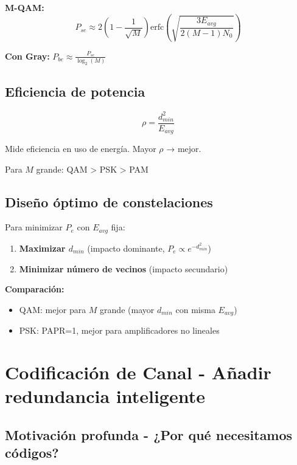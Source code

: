 \documentclass[10pt,a4paper]{article}
\begin{document}
\textbf{M-QAM:}
$$P_{se} \approx 2\left(1-\frac{1}{\sqrt{M}}\right)\text{erfc}\left(\sqrt{\frac{3E_{avg}}{2(M-1)N_0}}\right)$$

\textbf{Con Gray:} $P_{be} \approx \frac{P_{se}}{\log_2(M)}$

\subsection{Eficiencia de potencia}

$$\rho = \frac{d_{min}^2}{E_{avg}}$$

Mide eficiencia en uso de energía. Mayor $\rho$ → mejor.

Para $M$ grande: QAM > PSK > PAM

\subsection{Diseño óptimo de constelaciones}

\begin{tcolorbox}[colback=azulclaro!10,colframe=azuloscuro,title=Principios]
Para minimizar $P_e$ con $E_{avg}$ fija:
\begin{enumerate}
\item \textbf{Maximizar $d_{min}$} (impacto dominante, $P_e \propto e^{-d_{min}^2}$)
\item \textbf{Minimizar número de vecinos} (impacto secundario)
\end{enumerate}

\textbf{Comparación:}
\begin{itemize}
\item QAM: mejor para $M$ grande (mayor $d_{min}$ con misma $E_{avg}$)
\item PSK: PAPR=1, mejor para amplificadores no lineales
\end{itemize}
\end{tcolorbox}

\section{Codificación de Canal - Añadir redundancia inteligente}

\subsection{Motivación profunda - ¿Por qué necesitamos códigos?}
\end{document}
